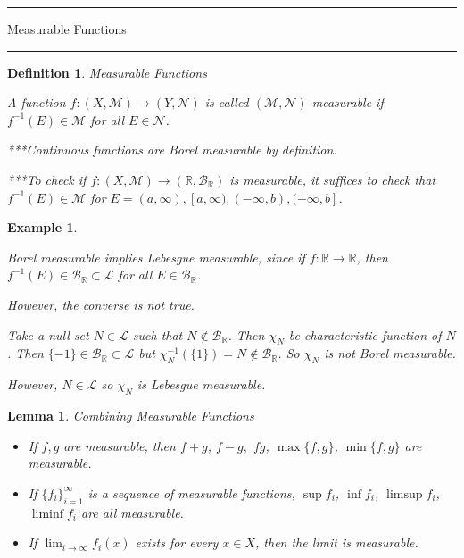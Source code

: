 \documentclass[12pt]{Qual}
\newtheorem{example}{Example}
\newtheorem{definition}{Definition}
\newtheorem{lemma}{Lemma}
\begin{document}
\begin{center}
\noindent\textcolor{blue!60!black}{\rule{15cm}{1mm}}
\Huge \faBug\faPuzzlePiece\faCoffee Measurable Functions \faCoffee\faPuzzlePiece\faBug
\vspace{-0.5cm}
\noindent\textcolor{blue!60!black}{\rule{15cm}{1mm}}
\end{center}
\vspace{0.5cm}
\begin{definition}{\Large\textit{Measurable Functions}}
$\,$

A function $f:(X,\mathscr{M})\to (Y,\mathscr{N})$ is called $(\mathscr{M},\mathscr{N})$-measurable if $f^{-1}(E)\in\mathscr{M}$ for all $E\in \mathscr{N}$.
\vspace{0.25cm}

***Continuous functions are Borel measurable by definition.

***To check if $f:(X,\mathscr{M})\to(\mathbb{R},\mathscr{B}_\mathbb{R})$ is measurable, it suffices to check that $f^{-1}(E)\in\mathscr{M}$ for $E=(a,\infty),[a,\infty),(-\infty,b),(-\infty,b]$.

\end{definition}
\vspace{0.5cm}
\begin{example}
$\,$

Borel measurable implies Lebesgue measurable, since if $f:\mathbb{R}\to\mathbb{R}$, then $f^{-1}(E)\in\mathscr{B}_\mathbb{R}\subset\mathscr{L}$ for all $E\in\mathscr{B}_\mathbb{R}$.

\vspace{0.5cm}

However, the converse is not true.

Take a null set $N\in\mathscr{L}$ such that $N\notin\mathscr{B}_\mathbb{R}$. Then $\chi_N$ be characteristic function of $N$. Then $\{-1\}\in\mathscr{B}_\mathbb{R}\subset\mathscr{L}$ but $\chi_N^{-1}(\{1\})=N\notin\mathscr{B}_\mathbb{R}$. So $\chi_N$ is not Borel measurable.

However, $N\in\mathscr{L}$ so $\chi_N$ \textit{is} Lebesgue measurable.
\end{example}
\vspace{0.5cm}
\begin{lemma}{\Large\textit{Combining Measurable Functions}}

\begin{itemize}
\setlength\itemsep{-0.1em}
\renewcommand\labelitemi{\faCoffee}
    \item If $f,g$ are measurable, then $f+g$, $f-g,$ $fg$, $\max\{f,g\}$, $\min\{f,g\}$ are measurable.
    \item If $\{f_i\}_{i=1}^\infty$ is a sequence of measurable functions, $\sup f_i$, $\inf f_i$, $\limsup f_i$, $\liminf f_i$ are all measurable.
    \item If $\displaystyle\lim_{i\to\infty}f_i(x)$ exists for every $x\in X$, then the limit is measurable.
\end{itemize}

\end{lemma}
\end{document}
